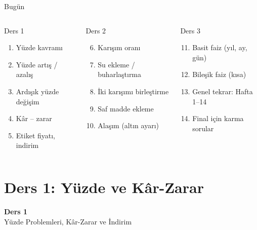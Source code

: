 \documentclass[aspectratio=169,11pt,handout]{beamer}
\begin{document}
\begin{frame}{Bugün}
\begin{columns}[t]
\begin{block}{Ders 1}
\begin{enumerate}
\item Yüzde kavramı
\item Yüzde artış / azalış
\item Ardışık yüzde değişim
\item Kâr -- zarar
\item Etiket fiyatı, indirim
\end{enumerate}
\end{block}
\begin{block}{Ders 2}
\begin{enumerate}\setcounter{enumi}{5}
\item Karışım oranı
\item Su ekleme / buharlaştırma
\item İki karışımı birleştirme
\item Saf madde ekleme
\item Alaşım (altın ayarı)
\end{enumerate}
\end{block}
\begin{block}{Ders 3}
\begin{enumerate}\setcounter{enumi}{10}
\item Basit faiz (yıl, ay, gün)
\item Bileşik faiz (kısa)
\item Genel tekrar: Hafta 1--14
\item Final için karma sorular
\end{enumerate}
\end{block}
\end{columns}
\end{frame}

\section{Ders 1: Yüzde ve Kâr-Zarar}
\begin{frame}
\centering\Large\color{anamavi}\textbf{Ders 1}\\[6pt]\normalsize Yüzde Problemleri, Kâr-Zarar ve İndirim
\end{frame}
\end{document}
